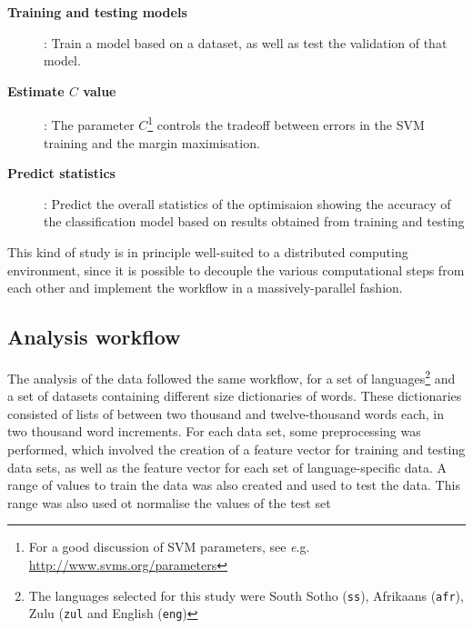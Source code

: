 \documentclass[smallcondensed]{svjour3}     %
\begin{document}
\begin{description}
  \item[\bf Training and testing models]: Train a model based on a dataset, as well as test the validation of that model.
  \item[\bf Estimate $C$ value]: The parameter $C$\footnote{For a good discussion of SVM parameters, see {\emph e.g.} \url{http://www.svms.org/parameters}} controls the tradeoff between errors in the SVM training and the margin maximisation.
  \item[\bf Predict statistics]: Predict the overall statistics of the optimisaion showing the accuracy of the classification model based on results obtained from training and testing
\end{description}
This kind of study is in principle well-suited to a distributed computing environment, since it is possible to decouple the various computational steps from each other and implement the workflow in a massively-parallel fashion.
\subsection{Analysis workflow}
\label{subsec:analysis}
The analysis of the data followed the same workflow, for a set of languages\footnote{The languages selected for this study were South Sotho (\texttt{ss}), Afrikaans (\texttt{afr}), Zulu (\texttt{zul} and English (\texttt{eng})} and a set of datasets containing different size dictionaries of words. These dictionaries consisted of lists of between two thousand and twelve-thousand words each, in two thousand word increments. %
For each data set, some preprocessing was performed, which involved the creation of a feature vector for training and testing data sets, as well as the feature vector for each set of language-specific data.
A range of values to train the data was also created and used to test the data. This range was also used ot normalise the values of the test set
\end{document}
